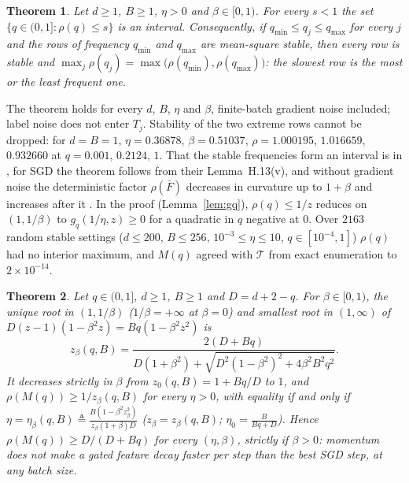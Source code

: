 \documentclass[11pt]{article}
\newtheorem{theorem}{Theorem}
\newcommand{\T}{\mathcal T}
\begin{document}
\begin{theorem}\label{thm:vocab}
Let $d\ge1$, $B\ge1$, $\eta>0$ and $\beta\in[0,1)$. For every $s<1$ the set $\{q\in(0,1]:\rho(q)\le s\}$ is an interval. Consequently, if $q_{\min}\le q_j\le q_{\max}$ for every $j$ and the rows of frequency $q_{\min}$ and $q_{\max}$ are mean-square stable, then every row is stable and $\max_j\rho(q_j)=\max\big(\rho(q_{\min}),\rho(q_{\max})\big)$: the slowest row is the most or the least frequent one.
\end{theorem}

The theorem holds for every $d$, $B$, $\eta$ and $\beta$, finite-batch gradient noise included; label noise does not enter $T_j$. Stability of the two extreme rows cannot be dropped: for $d=B=1$, $\eta=0.36878$, $\beta=0.51037$, $\rho=1.000195$, $1.016659$, $0.932660$ at $q=0.001$, $0.2124$, $1$. That the stable frequencies form an interval is in \citet[Lemma~H.13(i)]{everett2026sparse}, for SGD the theorem follows from their Lemma~H.13(v), and without gradient noise the deterministic factor $\rho(\bar F)$ decreases in curvature up to $1+\beta$ and increases after it \citep[proof of Proposition~H.15]{everett2026sparse}. In the proof (Lemma~\ref{lem:gq}), $\rho(q)\le1/z$ reduces on $(1,1/\beta)$ to $g_q(1/\eta,z)\ge0$ for a quadratic in $q$ negative at $0$. Over $2163$ random stable settings ($d\le200$, $B\le256$, $10^{-3}\le\eta\le10$, $q\in[10^{-4},1]$) $\rho(q)$ had no interior maximum, and $M(q)$ agreed with $\T$ from exact enumeration to $2\times10^{-14}$.

\begin{theorem}\label{thm:speed}
Let $q\in(0,1]$, $d\ge1$, $B\ge1$ and $D=d+2-q$. For $\beta\in[0,1)$, the unique root in $(1,1/\beta)$ ($1/\beta=+\infty$ at $\beta=0$) and smallest root in $(1,\infty)$ of $D(z-1)(1-\beta^2z)=Bq(1-\beta^2z^2)$ is
\[
z_\beta(q,B)=\frac{2(D+Bq)}{D(1+\beta^2)+\sqrt{D^2(1-\beta^2)^2+4\beta^2B^2q^2}} .
\]
It decreases strictly in $\beta$ from $z_0(q,B)=1+Bq/D$ to $1$, and $\rho(M(q))\ge1/z_\beta(q,B)$ for every $\eta>0$, with equality if and only if $\eta=\eta_\beta(q,B)\triangleq\frac{B(1-\beta^2z_\beta^2)}{z_\beta(1+\beta)D}$ ($z_\beta=z_\beta(q,B)$; $\eta_0=\frac{B}{Bq+D}$). Hence $\rho(M(q))\ge D/(D+Bq)$ for every $(\eta,\beta)$, strictly if $\beta>0$: momentum does not make a gated feature decay faster per step than the best SGD step, at any batch size.
\end{theorem}
\end{document}
